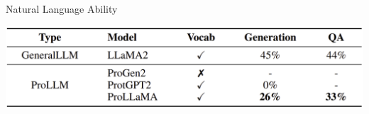 \documentclass[dvipsnames]{beamer}
\begin{document}
\begin{frame}{Natural Language Ability}
	\begin{center}
		\includegraphics[scale=0.21]{tables/natural_language_ability_comparison.png}
	\end{center}
\end{frame}


\end{document}
